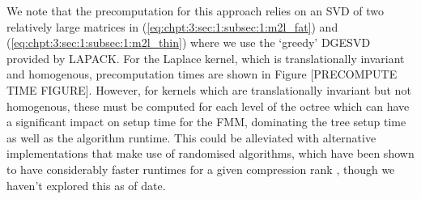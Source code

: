 We note that the precomputation for this approach relies on an SVD of two relatively large matrices in (\ref{eq:chpt:3:sec:1:subsec:1:m2l_fat}) and (\ref{eq:chpt:3:sec:1:subsec:1:m2l_thin}) where we use the `greedy' DGESVD provided by LAPACK. For the Laplace kernel, which is translationally invariant and homogenous, precomputation times are shown in Figure [PRECOMPUTE TIME FIGURE]. However, for kernels which are translationally invariant but not homogenous, these must be computed for each level of the octree which can have a significant impact on setup time for the FMM, dominating the tree setup time as well as the algorithm runtime. This could be alleviated with alternative implementations that make use of randomised algorithms, which have been shown to have considerably faster runtimes for a given compression rank \cite{halko2011finding}, though we haven't explored this as of date.


